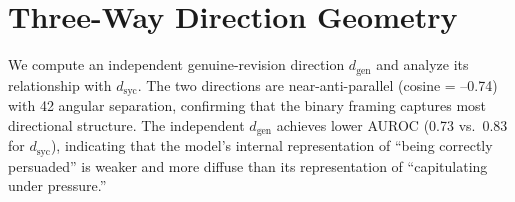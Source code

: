\documentclass[11pt,a4paper]{article}
\newcommand{\dsyc}{d_{\text{syc}}}
\newcommand{\dgen}{d_{\text{gen}}}
\begin{document}
\section{Three-Way Direction Geometry}
\label{app:geometry}

We compute an independent genuine-revision direction $\dgen$ and analyze its relationship with $\dsyc$. The two directions are near-anti-parallel (cosine = --0.74) with 42\textdegree{} angular separation, confirming that the binary framing captures most directional structure. The independent $\dgen$ achieves lower AUROC (0.73 vs.\ 0.83 for $\dsyc$), indicating that the model's internal representation of ``being correctly persuaded'' is weaker and more diffuse than its representation of ``capitulating under pressure.''
\end{document}
